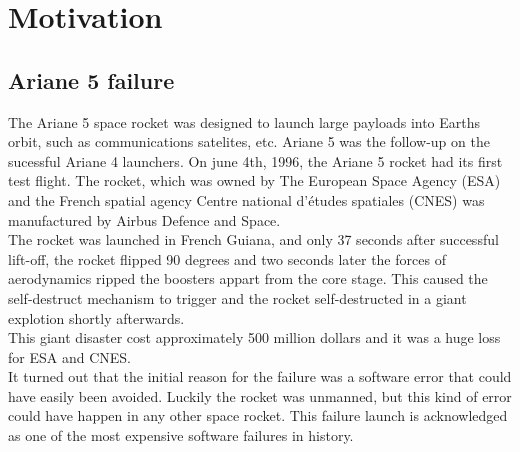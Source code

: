 \documentclass[a4paper]{report}
\begin{document}
\section{Motivation}
\subsection{Ariane 5 failure}
The Ariane 5 space rocket\cite{InquiryBoard1996} was designed to launch large payloads into Earths orbit, such as communications satelites, etc. Ariane 5 was the follow-up on the sucessful Ariane 4 launchers. On june 4th, 1996, the Ariane 5 rocket had its first test flight. The rocket, which was owned by The European Space Agency (ESA) and the French spatial agency Centre national d'études spatiales (CNES) was manufactured by Airbus Defence and Space.\\ The rocket was launched in French Guiana, and only 37 seconds after successful lift-off, the rocket flipped 90 degrees and two seconds later the forces of aerodynamics ripped the boosters appart from the core stage. This caused the self-destruct mechanism to trigger and the rocket self-destructed in a giant explotion shortly afterwards.\\ This giant disaster cost approximately 500 million dollars and it was a huge loss for ESA and CNES.  \\ 
It turned out that the initial reason for the failure was a software error that could have easily been avoided. Luckily the rocket was unmanned, but this kind of error could have happen in any other space rocket. This failure launch is acknowledged as one of the most expensive software failures in history. \\ 
\end{document}
